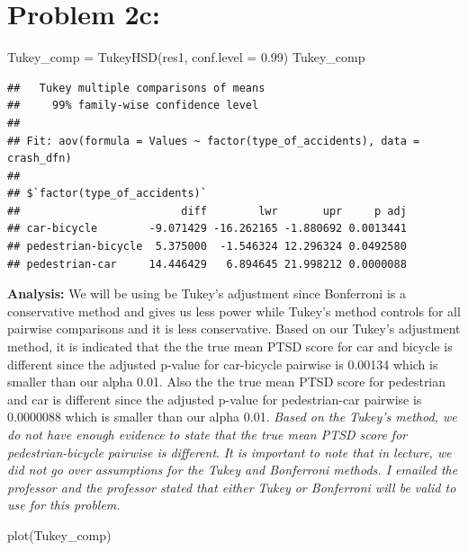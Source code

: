 \documentclass[
]{article}
\newenvironment{Shaded}{\begin{snugshade}}{\end{snugshade}}
\newcommand{\AttributeTok}[1]{\textcolor[rgb]{0.77,0.63,0.00}{#1}}
\newcommand{\FloatTok}[1]{\textcolor[rgb]{0.00,0.00,0.81}{#1}}
\newcommand{\FunctionTok}[1]{\textcolor[rgb]{0.00,0.00,0.00}{#1}}
\newcommand{\NormalTok}[1]{#1}
\newcommand{\OtherTok}[1]{\textcolor[rgb]{0.56,0.35,0.01}{#1}}
\begin{document}
\newpage

\hypertarget{problem-2c}{%
\section{Problem 2c:}\label{problem-2c}}

\begin{Shaded}
\begin{Highlighting}[]
\NormalTok{Tukey\_comp }\OtherTok{=} \FunctionTok{TukeyHSD}\NormalTok{(res1, }\AttributeTok{conf.level =} \FloatTok{0.99}\NormalTok{)}
\NormalTok{Tukey\_comp}
\end{Highlighting}
\end{Shaded}

\begin{verbatim}
##   Tukey multiple comparisons of means
##     99% family-wise confidence level
## 
## Fit: aov(formula = Values ~ factor(type_of_accidents), data = crash_dfn)
## 
## $`factor(type_of_accidents)`
##                         diff        lwr       upr     p adj
## car-bicycle        -9.071429 -16.262165 -1.880692 0.0013441
## pedestrian-bicycle  5.375000  -1.546324 12.296324 0.0492580
## pedestrian-car     14.446429   6.894645 21.998212 0.0000088
\end{verbatim}

\textbf{Analysis:} We will be using be Tukey's adjustment since
Bonferroni is a conservative method and gives us less power while
Tukey's method controls for all pairwise comparisons and it is less
conservative. Based on our Tukey's adjustment method, it is indicated
that the the true mean PTSD score for car and bicycle is different since
the adjusted p-value for car-bicycle pairwise is 0.00134 which is
smaller than our alpha 0.01. Also the the true mean PTSD score for
pedestrian and car is different since the adjusted p-value for
pedestrian-car pairwise is 0.0000088 which is smaller than our alpha
0.01. \emph{Based on the Tukey's method, we do not have enough evidence
to state that the true mean PTSD score for pedestrian-bicycle pairwise
is different}. \emph{It is important to note that in lecture, we did not
go over assumptions for the Tukey and Bonferroni methods. I emailed the
professor and the professor stated that either Tukey or Bonferroni will
be valid to use for this problem.}

\newpage

\begin{Shaded}
\begin{Highlighting}[]
\FunctionTok{plot}\NormalTok{(Tukey\_comp)}
\end{Highlighting}
\end{Shaded}
\end{document}
